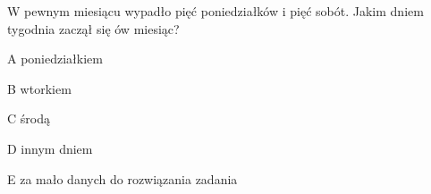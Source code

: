 \begin{tresc}
W pewnym miesiącu wypadło pięć poniedziałków i pięć sobót. Jakim dniem tygodnia zaczął się ów miesiąc?
\end{tresc}
\begin{wariant}{A} poniedziałkiem \end{wariant}
\begin{wariant}{B} wtorkiem \end{wariant}
\begin{wariant}{C} środą \end{wariant}
\begin{wariant}{D} innym dniem \end{wariant}
\begin{wariant}{E} za mało danych do rozwiązania zadania \end{wariant}
